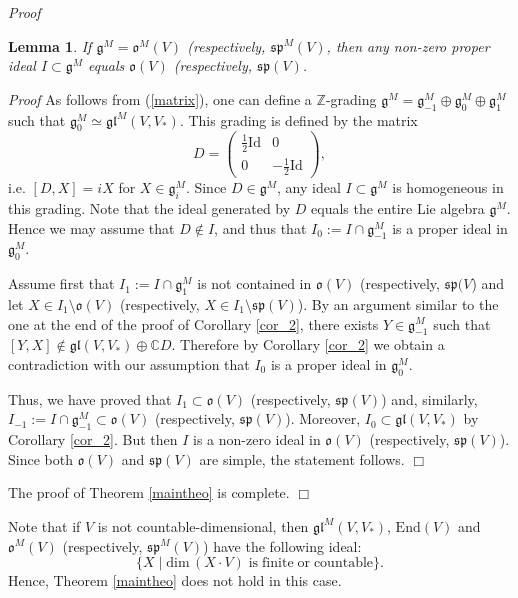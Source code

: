 \documentclass{svmult}
\newtheorem{lem}[theo]{Lemma}
\renewenvironment{proof}{ \emph{Proof}}{$\Box$}
\newcommand {\CC} {\mathbb {C}}
\renewcommand{\sp}{\mathfrak{sp}}
\newcommand{\ojl}{\mathfrak{gl}}
\newcommand{\oo}{\mathfrak{o}}
\renewcommand{\gg}{\mathfrak{g}}
\newcommand{\gl}{\mathfrak{gl}}
\newcommand{\End}{\mathrm{End}}
\begin{document}
\begin{proof}
\begin{lem}\label{lem_idideal}
 If $\gg^M = \oo^M(V)$ (respectively, $ \sp^M(V)$, then any non-zero proper ideal $I \subset \gg^M$ 
equals $\oo(V)$  (respectively, $\sp(V)$.
\end{lem}

\begin{proof} As follows from (\ref{matrix}), one can define a $\mathbb Z$-grading 
 $\gg^M=\gg^M_{-1} \oplus \gg^M_0 \oplus \gg^M_1$ such that $\gg^M_0 \simeq {\ojl}^M(V,V_*)$. 
This  grading is defined by the matrix
\begin{equation}\label{grad_matrix}
D=\left(
\begin{array}{c|c}
 \frac{1}{2}\mathrm{Id} & 0 \\ \hline
 0 & -\frac{1}{2}\mathrm{Id} 
\end{array}
\right),\nonumber 
\end{equation}
i.e. $[D,X] = iX$ for $X \in \gg^M_i$. Since $D\in\gg^M$, any ideal $I\subset\gg^M$ is homogeneous in this grading. Note that the ideal generated by $D$ equals the entire Lie  algebra  $\gg^M$. Hence we may assume that $D\notin I$, and thus that $I_0 := I \cap \gg^M_{-1}$ is a proper ideal in $\gg^M_0$.  

Assume first that $I_1:=I \cap \gg_1^M$ is not contained in 
$\oo(V)$  (respectively, $\sp(V$) and let $X\in I_1\setminus \oo(V) $ (respectively, $X\in I_1\setminus \sp(V) $). 
By an argument similar to the one at the end of the proof of Corollary \ref{cor_2}, there exists $Y\in \gg^M_{-1}$ such that 
$[Y,X]\notin  \gl(V,V_*)\oplus \CC D$. Therefore by Corollary \ref{cor_2} we obtain a contradiction with our assumption that $I_0$ is a proper ideal in $\gg^M_0$.

Thus, we have proved that $I_1\subset \oo(V)$   (respectively, $\sp(V)$) and, similarly, $I_{-1}:=I \cap \gg_{-1}^M \subset \oo(V)$   (respectively, $\sp(V)$). 
Moreover, $I_0\subset  \gl (V,V_*)$ by Corollary  \ref{cor_2}. But then $I$ is a non-zero ideal in  $\oo(V)$   (respectively, $\sp(V)$).
Since both  $\oo(V)$ and $\sp(V)$ are simple, the statement follows.
\end{proof}

The proof of Theorem \ref{maintheo} is complete.
\end{proof}

\vspace{0.33cm}

Note that if $V$ is not countable-dimensional, then $\gl^M(V,V_*)$, $\End(V)$ and  $\oo^M(V)$ (respectively, $\sp^M(V)$)  have the following ideal:
\begin{equation}\label{ideal}
\lbrace X \;|\; \mathrm{dim}\,(X\cdot V) \mathrm{\;is\;finite\;or\;countable}\rbrace.\nonumber
\end{equation}
Hence, Theorem \ref{maintheo} does not hold in this case.
\end{document}
